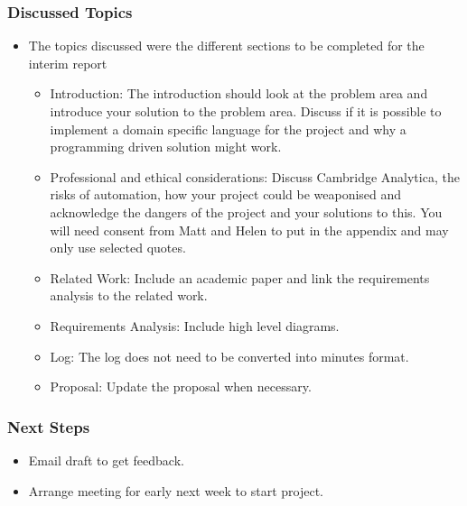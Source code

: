 \begin{appendices}
\subsubsection{Discussed Topics}

\begin{itemize}

 \item The topics discussed were the different sections to be completed for the
 interim report
    \begin{itemize}
    
     \item Introduction: The introduction should look at the problem area and introduce your solution to the problem area. Discuss if it is possible to implement a domain specific language for the project and why a programming driven solution might work.
     \item Professional and ethical considerations: Discuss Cambridge Analytica, the risks of automation, how your project could be weaponised and acknowledge the dangers of the project and your solutions to this. You will need consent from Matt and Helen to put in the appendix and may only use selected quotes.
     \item Related Work: Include an academic paper and link the requirements analysis to the related work.
     \item Requirements Analysis: Include high level diagrams.
     \item Log: The log does not need to be converted into minutes format.
     \item Proposal: Update the proposal when necessary.
    \end{itemize}
\end{itemize}

\subsubsection{Next Steps}

\begin{itemize}

 \item Email draft to get feedback.
 \item Arrange meeting for early next week to start project.
\end{itemize}

\end{appendices}